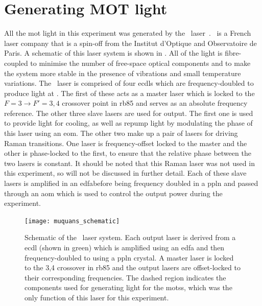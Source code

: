 \section{Generating MOT light}\label{sec:muquans_light}
All the \ac{mot} light in this experiment was generated by the \Muquans\
laser~\cite{muquansWebPage}. \Muquans\ is a French laser company that is a
spin-off from the Institut d'Optique and Observatoire de Paris. A schematic of
this laser system is shown in \FigureRef{fig:muquans_schematic}. All of the
light is fibre-coupled to minimise the number of free-space optical components
and to make the system more stable in the presence of vibrations and small
temperature variations. The \Muquans\ laser is comprised of four
\sivalue{1560}{\nano\metre} \acp{ecdl} which are frequency-doubled to produce
light at \sivalue{780}{\nano\metre}. The first of these acts as a master laser
which is locked to the \(F = 3 \rightarrow F' = 3,4\) crossover point in
\ac{rb85} and serves as an absolute frequency reference. The other three slave
lasers are used for output. The first one is used to provide light for cooling,
as well as repump light by modulating the phase of this laser using an \ac{eom}.
The other two make up a pair of lasers for driving Raman transitions. One laser
is frequency-offset locked to the master and the other is phase-locked to the
first, to ensure that the relative phase between the two lasers is constant. It
should be noted that this Raman laser was not used in this experiment, so will
not be discussed in further detail. Each of these slave lasers is amplified in
an \ac{edfa}before being frequency doubled in a \ac{ppln} and passed through an
\ac{aom} which is used to control the output power during the experiment.
\begin{figure}
	\texttt{[image: muquans\_schematic]}
	\caption[\Muquans\ Laser System Diagram]{Schematic of the \Muquans\ laser system. Each output laser is derived from a \acs{ecdl} (shown in green) which is amplified using an \acs{edfa} and then frequency-doubled to  using a \acs{ppln} crystal. A master laser is locked to the 3,4 crossover in \ac{rb85} and the output lasers are offset-locked to their corresponding frequencies. The dashed region indicates the components used for generating light for the \acp{mots}, which was the only function of this laser for this experiment.}\label{fig:muquans_schematic}
\end{figure}

